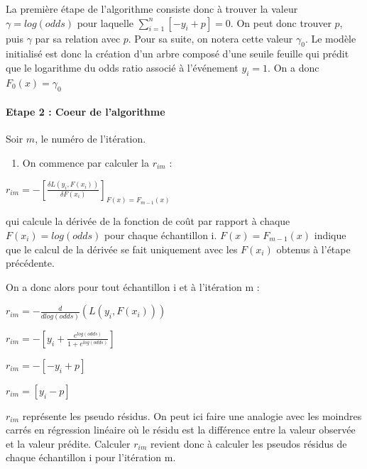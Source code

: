 \documentclass[
]{article}
\providecommand{\tightlist}{%
  \setlength{\itemsep}{0pt}\setlength{\parskip}{0pt}}
\begin{document}
La première étape de l'algorithme consiste donc à trouver la valeur
\(\gamma=log(odds)\) pour laquelle \(\sum^n_{i=1}[-y_i+p]=0\). On peut
donc trouver \(p\), puis \(\gamma\) par sa relation avec \(p\). Pour sa
suite, on notera cette valeur \(\gamma_0\). Le modèle initialisé est
donc la création d'un arbre composé d'une seuile feuille qui prédit que
le logarithme du odds ratio associé à l'événement \(y_i=1\). On a donc
\(F_0(x)=\gamma_0\)

\hypertarget{etape-2-coeur-de-lalgorithme}{%
\paragraph{Etape 2 : Coeur de
l'algorithme}\label{etape-2-coeur-de-lalgorithme}}

Soir \(m\), le numéro de l'itération.

\begin{enumerate}
\def\labelenumi{\Alph{enumi})}
\tightlist
\item
  On commence par calculer la \(r_{im}\) :
\end{enumerate}

\begin{center} 

  $r_{im}= -[\frac{\delta L(y_i,F(x_i))}{\delta F(x_i)}]_{F(x)=F_{m-1}(x)}$

\end{center}

qui calcule la dérivée de la fonction de coût par rapport à chaque
\(F(x_i)=log(odds)\) pour chaque échantillon i. \(F(x)=F_{m-1}(x)\)
indique que le calcul de la dérivée se fait uniquement avec les
\(F(x_i)\) obtenus à l'étape précédente.

On a donc alors pour tout échantillon i et à l'itération m :

\begin{center}
  $r_{im}=- \frac{d}{dlog(odds)}(L(y_i,F(x_i)))$
  
  $r_{im}= - [y_i+\frac{e^{log(odds)}}{1+e^{log(odds)}}]$
  
  $r_{im}= - [-y_i + p]$
  
  $r_{im} = [y_i -p]$
\end{center}

\(r_{im}\) représente les pseudo résidus. On peut ici faire une analogie
avec les moindres carrés en régression linéaire où le résidu est la
différence entre la valeur observée et la valeur prédite. Calculer
\(r_{im}\) revient donc à calculer les pseudos résidus de chaque
échantillon i pour l'itération m.
\end{document}
